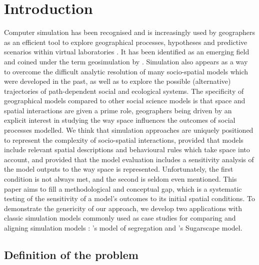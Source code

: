 \documentclass{JASSS}
\begin{document}
\section{Introduction}

Computer simulation has been recognised and is increasingly used by geographers as an efficient tool to explore geographical processes, hypotheses and predictive scenarios within virtual laboratories \citep{batty1971modelling, batty2007model, carley1999generating, Quesneletal2009}. It has been identified as an emerging field and coined under the term geosimulation by \cite{benenson2004geosimulation}. Simulation also appears as a way to overcome the difficult analytic resolution of many socio-spatial models which were developed in the past, as well as to explore the possible (alternative) trajectories of path-dependent social and ecological systems. The specificity of geographical models compared to other social science models is that space and spatial interactions are given a prime role, geographers being driven by an explicit interest in studying the way space influences the outcomes of social processes modelled. We think that simulation approaches are uniquely positioned to represent the complexity of socio-spatial interactions, provided that models include relevant spatial descriptions and behavioural rules which take space into account, and provided that the model evaluation includes a sensitivity analysis of the model outputs to the way space is represented. Unfortunately, the first condition is not always met, and the second is seldom even mentioned. This paper aims to fill a methodological and conceptual gap, which is a systematic testing of the sensitivity of a model's outcomes to its initial spatial conditions. To demonstrate the genericity of our approach, we develop two applications with classic simulation models commonly used as case studies for comparing and aligning simulation models \citep{Axtelletal1996, wilensky2007making}: \citet{schelling1971dynamic}'s model of segregation and \citet{EpsteinAxtell1996}'s Sugarscape model.\\

\subsection{Definition of the problem}
\end{document}
